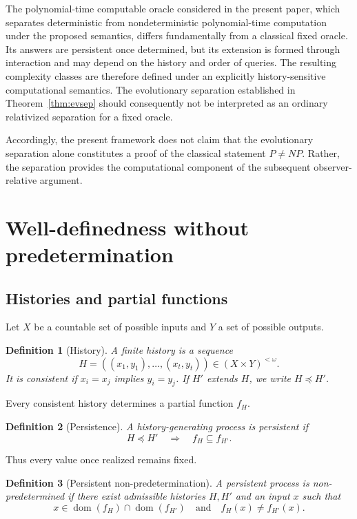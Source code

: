\documentclass[11pt]{article}
\newtheorem{definition}{Definition}[section]
\begin{document}
The polynomial-time computable oracle considered in the present paper, which separates deterministic from nondeterministic polynomial-time computation under the proposed semantics, differs fundamentally from a classical fixed oracle.  Its answers are persistent once determined, but its extension is formed through
interaction and may depend on the history and order of queries.  The resulting complexity
classes are therefore defined under an explicitly history-sensitive computational semantics.
The evolutionary separation established in Theorem~\ref{thm:evsep} should consequently not
be interpreted as an ordinary relativized separation for a fixed oracle.

Accordingly, the present framework does not claim that the evolutionary separation alone
constitutes a proof of the classical statement \(P\neq NP\).  Rather, the separation provides
the computational component of the subsequent observer-relative argument.   



\section{Well-definedness without predetermination}

\subsection{Histories and partial functions}

Let \(X\) be a countable set of possible inputs and \(Y\) a set of possible outputs.

\begin{definition}[History]
A finite history is a sequence
\[
  H=((x_1,y_1),\ldots,(x_t,y_t))\in(X\times Y)^{<\omega}.
\]
It is \emph{consistent} if \(x_i=x_j\) implies \(y_i=y_j\).  If \(H'\) extends \(H\),
we write \(H\preceq H'\).
\end{definition}

Every consistent history determines a partial function \(f_H\).

\begin{definition}[Persistence]
A history-generating process is \emph{persistent} if
\[
  H\preceq H'\quad\Longrightarrow\quad f_H\subseteq f_{H'}.
\]
\end{definition}

Thus every value once realized remains fixed.

\begin{definition}[Persistent non-predetermination]
A persistent process is \emph{non-predetermined} if there exist admissible histories
\(H,H'\) and an input \(x\) such that
\[
  x\in\operatorname{dom}(f_H)\cap\operatorname{dom}(f_{H'})
  \quad\text{and}\quad
  f_H(x)\neq f_{H'}(x).
\]
\end{definition}
\end{document}
